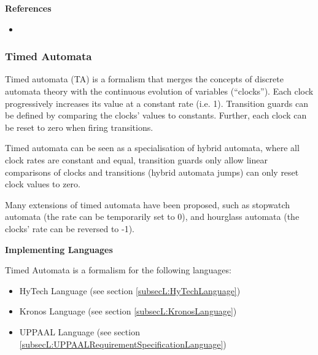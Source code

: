 


\textbf{References}
\begin{itemize}
	
\item {}
\end{itemize}



\subsubsection{Timed Automata}
\label{subsecF:TimedAutomata}


Timed automata (TA) is a formalism that merges the concepts of discrete automata theory with the continuous evolution of variables (``clocks''). 
Each clock progressively increases its value at a constant rate (i.e. 1).
Transition guards can be defined by comparing the clocks' values to constants.
Further, each clock can be reset to zero when firing transitions.

Timed automata can be seen as a specialisation of hybrid automata, where all clock rates are constant and equal, transition guards only allow linear comparisons of clocks and transitions (hybrid automata jumps) can only reset clock values to zero.

Many extensions of timed automata have been proposed, such as stopwatch automata (the rate can be temporarily set to 0), and hourglass automata (the clocks' rate can be reversed to -1).

\textbf{Implementing Languages}

Timed Automata is a formalism for the following languages:
\begin{itemize}
	\item HyTech Language (see section \ref{subsecL:HyTechLanguage})
	\item Kronos Language (see section \ref{subsecL:KronosLanguage})
	\item UPPAAL Language (see section \ref{subsecL:UPPAALRequirementSpecificationLanguage})
\end{itemize}





